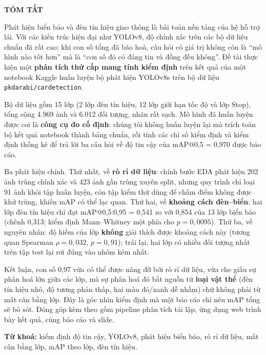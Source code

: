 \newpage
\thispagestyle{plain}

\begin{center}
    {\bfseries\Large TÓM TẮT}
\end{center}

\vspace{1cm}

Phát hiện biển báo và đèn tín hiệu giao thông là bài toán nền tảng của hệ hỗ trợ lái. Với các
kiến trúc hiện đại như YOLOv8, độ chính xác trên các bộ dữ liệu chuẩn đã rất cao; khi con số
tổng đã bão hoà, câu hỏi có giá trị không còn là ``mô hình nào tốt hơn'' mà là ``con số đó có
đáng tin và đồng đều không''. Đề tài thực hiện một \textbf{phân tích thứ cấp mang tính kiểm định}
trên kết quả của một notebook Kaggle huấn luyện bộ phát hiện YOLOv8s trên bộ dữ liệu
\texttt{pkdarabi/cardetection}.

Bộ dữ liệu gồm 15 lớp (2 lớp đèn tín hiệu, 12 lớp giới hạn tốc độ và lớp Stop), tổng cộng
4.969 ảnh và 6.012 đối tượng, nhãn rất sạch. Mô hình đã huấn luyện được coi là \textbf{công cụ
đo cố định}: chúng tôi không huấn luyện lại mà trích toàn bộ kết quả notebook thành bảng chuẩn,
rồi tính các chỉ số kiểm định và kiểm định thống kê để trả lời ba câu hỏi về độ tin cậy của
mAP@0,5 = 0,970 được báo cáo.

Ba phát hiện chính. Thứ nhất, về \textbf{rò rỉ dữ liệu}: chính bước EDA phát hiện 202 ảnh trùng
chính xác và 423 ảnh gần trùng xuyên split, nhưng quy trình chỉ loại 91 ảnh khỏi tập huấn luyện,
còn tập kiểm thử dùng để chấm điểm không được khử trùng, khiến mAP có thể lạc quan. Thứ hai, về
\textbf{khoảng cách đèn--biển}: hai lớp đèn tín hiệu chỉ đạt mAP@0,5:0,95 = 0,541 so với 0,854
của 13 lớp biển báo (chênh 0,313; kiểm định Mann--Whitney một phía cho $p = 0{,}0095$). Thứ ba,
về nguyên nhân: độ hiếm của lớp \textbf{không} giải thích được khoảng cách này (tương quan
Spearman $\rho = 0{,}032$, $p = 0{,}91$); trái lại, hai lớp có nhiều đối tượng nhất trên tập test
lại rơi đúng vào nhóm kém nhất.

Kết luận, con số 0,97 vừa có thể được nâng đỡ bởi rò rỉ dữ liệu, vừa che giấu sự phân hoá lớn
giữa các lớp, mà sự phân hoá đó bắt nguồn từ \textbf{loại vật thể} (đèn tín hiệu nhỏ, độ tương
phản thấp, hai màu đỏ/xanh dễ nhầm) chứ không phải từ mất cân bằng lớp. Đây là góc nhìn kiểm định
mà một báo cáo chỉ nêu mAP tổng sẽ bỏ sót. Đóng góp kèm theo gồm pipeline phân tích tái lập, ứng
dụng web trình bày kết quả, cùng báo cáo và slide.

\vspace{0.5cm}
\noindent\textbf{Từ khoá:} kiểm định độ tin cậy, YOLOv8, phát hiện biển báo, rò rỉ dữ liệu,
mất cân bằng lớp, mAP theo lớp, đèn tín hiệu.
